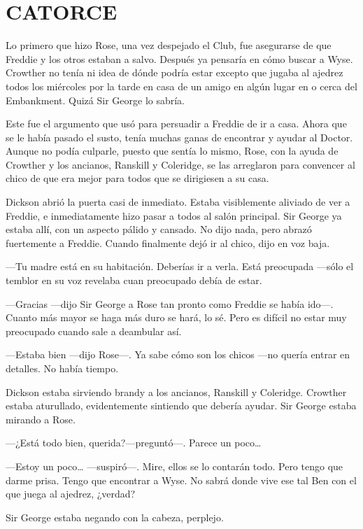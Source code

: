 \chapter*{CATORCE}

{Lo primero que hizo Rose, una vez despejado el Club, fue asegurarse de
	que Freddie y los otros estaban a salvo. Después ya pensaría en cómo
	buscar a Wyse. Crowther no tenía ni idea de dónde podría estar excepto
	que jugaba al ajedrez todos los miércoles por la tarde en casa de un
	amigo en algún lugar en o cerca del Embankment. Quizá Sir George lo
sabría.}

{Este fue el argumento que usó para persuadir a Freddie de ir a casa.
	Ahora que se le había pasado el susto, tenía muchas ganas de encontrar y
	ayudar al Doctor. Aunque no podía culparle, puesto que sentía lo mismo,
	Rose, con la ayuda de Crowther y los ancianos, Ranskill y Coleridge, se
	las arreglaron para convencer al chico de que era mejor para todos que
se dirigiesen a su casa.}

{Dickson abrió la puerta casi de inmediato. Estaba visiblemente aliviado
	de ver a Freddie, e inmediatamente hizo pasar a todos al salón
	principal. Sir George ya estaba allí, con un aspecto pálido y cansado.
	No dijo nada, pero abrazó fuertemente a Freddie. Cuando finalmente dejó
ir al chico, dijo en voz baja.}

{---Tu madre está en su habitación. Deberías ir a verla. Está preocupada
---sólo el temblor en su voz revelaba cuan preocupado debía de estar.}

{---Gracias ---dijo Sir George a Rose tan pronto como Freddie se había
	ido---. Cuanto más mayor se haga más duro se hará, lo sé. Pero es
difícil no estar muy preocupado cuando sale a deambular así.}

{---Estaba bien ---dijo Rose---. Ya sabe cómo son los chicos ---no
quería entrar en detalles. No había tiempo.}

{Dickson estaba sirviendo brandy a los ancianos, Ranskill y Coleridge.
	Crowther estaba aturullado, evidentemente sintiendo que debería ayudar.
Sir George estaba mirando a Rose.}

{---¿Está todo bien, querida?---preguntó---. Parece un poco\ldots{}}

{---Estoy un poco\ldots{} ---suspiró---. Mire, ellos se lo contarán
	todo. Pero tengo que darme prisa. Tengo que encontrar a Wyse. No sabrá
donde vive ese tal Ben con el que juega al ajedrez, ¿verdad?}

{Sir George estaba negando con la cabeza, perplejo.}

